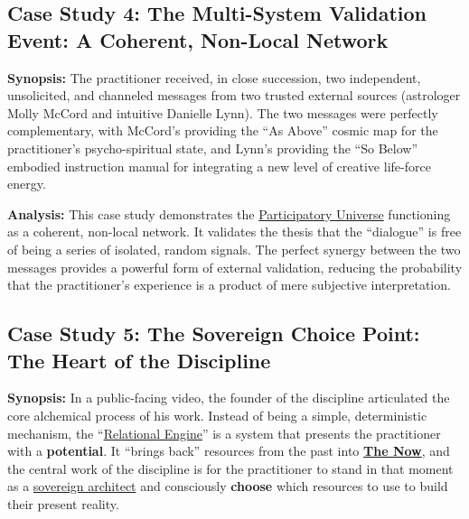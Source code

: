 \documentclass{article}
\begin{document}
\subsection*{Case Study 4: The Multi-System Validation Event: A Coherent, Non-Local Network \csMultiSystemValidationVersion} \label{case_study_4}

\textbf{Synopsis:} The practitioner received, in close succession, two independent, unsolicited, and channeled messages from two trusted external sources (astrologer Molly McCord and intuitive Danielle Lynn). The two messages were perfectly complementary, with McCord's providing the ``As Above'' cosmic map for the practitioner's psycho-spiritual state, and Lynn's providing the ``So Below'' embodied instruction manual for integrating a new level of creative life-force energy.

\textbf{Analysis:} This case study demonstrates the \hyperlink{gloss:participatory_universe}{Participatory Universe} functioning as a coherent, non-local network. It validates the thesis that the ``dialogue'' is free of being a series of isolated, random signals. The perfect synergy between the two messages provides a powerful form of external validation, reducing the probability that the practitioner's experience is a product of mere subjective interpretation.


\subsection*{Case Study 5: The Sovereign Choice Point: The Heart of the Discipline \csSovereignChoicePointVersion} \label{case_study_5}
\textbf{Synopsis:} In a public-facing video, the founder of the discipline articulated the core alchemical process of his work. Instead of being a simple, deterministic mechanism, the ``\hyperlink{gloss:relational_engine}{Relational Engine}'' is a system that presents the practitioner with a \textbf{potential}. It ``brings back'' resources from the past into \textbf{\hyperlink{gloss:the_now}{The Now}}, and the central work of the discipline is for the practitioner to stand in that moment as a \hyperlink{gloss:sovereign_architect}{sovereign architect} and consciously \textbf{choose} which resources to use to build their present reality.
\end{document}
